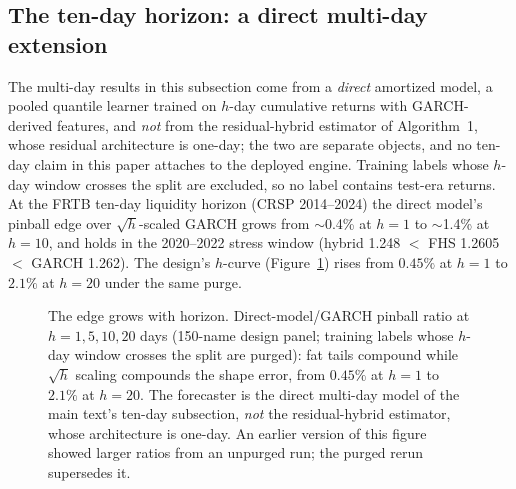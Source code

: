 \documentclass[11pt]{article}
\theoremstyle{remark}
\begin{document}
\subsection{The ten-day horizon: a direct multi-day extension}

The multi-day results in this subsection come from a \emph{direct} amortized model, a pooled quantile learner trained on $h$-day
cumulative returns with GARCH-derived features, and \emph{not} from the residual-hybrid estimator of Algorithm~1, whose residual
architecture is one-day; the two are separate objects, and no
ten-day claim in this paper attaches to the deployed engine. Training
labels whose $h$-day window crosses the split are excluded, so no
label contains test-era returns. At the FRTB ten-day
liquidity horizon (CRSP 2014--2024) the direct model's pinball edge
over $\sqrt{h}$-scaled GARCH grows
from $\sim$0.4\% at $h=1$ to $\sim$1.4\% at $h=10$, and holds in the
2020--2022 stress window (hybrid 1.248 $<$ FHS 1.2605 $<$ GARCH 1.262).
The design's $h$-curve (Figure~\ref{fig:horizon}) rises from
$0.45\%$ at $h{=}1$ to $2.1\%$ at $h{=}20$ under the same purge.
\begin{figure}[t]
\centering
{}
\caption{The edge grows with horizon. Direct-model/GARCH pinball
ratio at $h = 1, 5, 10, 20$ days (150-name design panel; training
labels whose $h$-day window crosses the split are purged): fat tails
compound while $\sqrt{h}$ scaling compounds the shape error, from $0.45\%$ at $h{=}1$ to $2.1\%$ at $h{=}20$. The forecaster is the
direct multi-day model of the main text's ten-day subsection,
\emph{not} the residual-hybrid estimator, whose architecture is
one-day. An earlier version of this figure showed larger ratios from
an unpurged run; the purged rerun supersedes it.}
\label{fig:horizon}
\end{figure}
\end{document}
